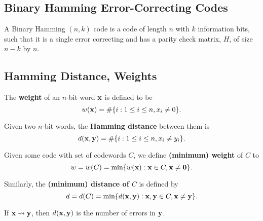 \subsection{Binary Hamming Error-Correcting Codes}
A Binary Hamming \((n, k)\) code is a code of length \(n\) with \(k\) information bits, such that it is a single error correcting and has a parity check matrix, \(H\), of size \(n - k\) by \(n\).

\subsection{Hamming Distance, Weights}
The \textbf{weight} of an \(n\)-bit word \(\mathbf{x}\) is defined to be
\[w(\mathbf{x}) = \# \{i : 1 \leq i \leq n, x_i \neq 0\}.\]

Given two \(n\)-bit words, the \textbf{Hamming distance} between them is
\[d(\mathbf{x}, \mathbf{y}) = \# \{i : 1 \leq i \leq n, x_i \neq y_i \}.\]

Given some code with set of codewords \(C\), we define \textbf{(minimum) weight} of \(C\) to
\[w = w(C) = \min\{w(\mathbf{x}) : \mathbf{x} \in C, \mathbf{x} \neq \mathbf{0}\}.\]

Similarly, the \textbf{(minimum) distance of \(C\)} is defined by
\[d = d(C) = \min\{d(\mathbf{x}, \mathbf{y}) : \mathbf{x}, \mathbf{y} \in C, \mathbf{x} \neq \mathbf{y} \}.\]

If \(\mathbf{x} \rightsquigarrow \mathbf{y}\), then \(d(\mathbf{x}, \mathbf{y})\) is the number of errors in \(\mathbf{y}\).